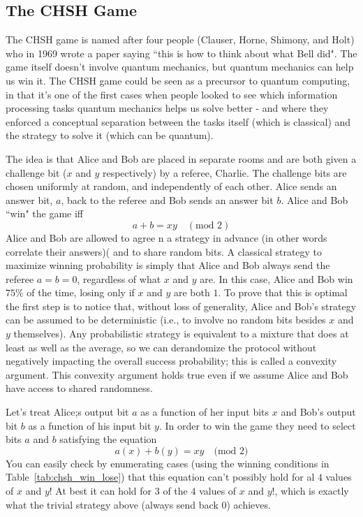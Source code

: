 \subsection{The CHSH Game}
The CHSH game is named after four people (Clauser, Horne, Shimony, and Holt) who in 1969 wrote a paper saying ``this is how to think about what Bell did". The game itself doesn't involve quantum mechanics, but quantum mechanics can help us win it. The CHSH game could be seen as a precursor to quantum computing, in that it's one of the first cases when people looked to see which information processing tasks quantum mechanics helps us solve better - and where they enforced a conceptual separation between the tasks itself (which is classical) and the strategy to solve it (which can be quantum).

The idea is that Alice and Bob are placed in separate rooms and are both given a challenge bit ($x$ and $y$ respectively) by a referee, Charlie. The challenge bits are chosen uniformly at random, and independently of each other. Alice sends an answer bit, $a$, back to the referee and Bob sends an answer bit $b$. Alice and Bob ``win" the game iff
\[
a+b=xy \quad(\text{mod 2})
\]
Alice and Bob are allowed to agree n a strategy in advance (in other words correlate their answers)( and to share random bits. A classical strategy to maximize winning probability is simply that Alice and Bob always send the referee $a=b=0$, regardless of what $x$ and $y$ are. In this case, Alice and Bob win $75\%$ of the time, losing only if $x$ and $y$ are both $1$. To prove that this is optimal the first step is to notice that, without loss of generality, Alice and Bob's strategy can be assumed to be deterministic (i.e., to involve no random bits besides $x$ and $y$ themselves). Any probabilistic strategy is equivalent to a mixture that does at least as well as the average, so we can derandomize the protocol without negatively impacting the overall success probability; this is called a convexity argument. This convexity argument holds true even if we assume Alice and Bob have access to shared randomness.

Let's treat Alice;s output bit $a$ as a function of her input bits $x$ and Bob's output bit $b$ as a function of his input bit $y$. In order to win the game they need to select bits $a$ and $b$ satisfying the equation
\[
a(x)+b(y)=xy \quad \text{(mod 2)}
\]
You can easily check by enumerating cases (using the winning conditions in Table~\ref{tab:chsh_win_lose}) that this equation can't possibly hold for al $4$ values of $x$ and $y$! At best it can hold for $3$ of the $4$ values of $x$ and $y$!, which is exactly what the trivial strategy above (always send back $0$) achieves.

